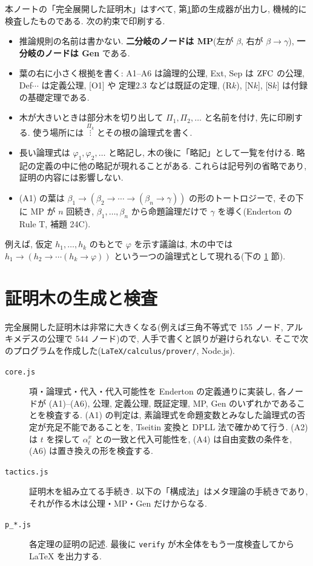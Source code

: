 本ノートの「完全展開した証明木」はすべて, 第\ref{sec:generator}節の生成器が出力し, 機械的に検査したものである. 次の約束で印刷する.
\begin{itemize}
  \item 推論規則の名前は書かない. \textbf{二分岐のノードは MP}(左が $\beta$, 右が $\beta \to \gamma$), \textbf{一分岐のノードは Gen} である.
  \item 葉の右に小さく根拠を書く: \textsf{A1}--\textsf{A6} は論理的公理, \textsf{Ext}, \textsf{Sep} は $\mathrm{ZFC}$ の公理, \textsf{Def$\cdots$} は定義公理, [O1] や 定理2.3 などは既証の定理, (R$k$), [N$k$], [S$k$] は付録の基礎定理である.
  \item 木が大きいときは部分木を切り出して $\Pi_1, \Pi_2, \ldots$ と名前を付け, 先に印刷する. 使う場所には $\overset{\Pi_k}{\vdots}$ とその根の論理式を書く.
  \item 長い論理式は $\varphi_1, \varphi_2, \ldots$ と略記し, 木の後に「略記」として一覧を付ける. 略記の定義の中に他の略記が現れることがある. これらは記号列の省略であり, 証明の内容には影響しない.
  \item (A1) の葉は $\beta_1 \to (\beta_2 \to \cdots \to (\beta_n \to \gamma))$ の形のトートロジーで, その下に MP が $n$ 回続き, $\beta_1, \ldots, \beta_n$ から命題論理だけで $\gamma$ を導く(Enderton の Rule T, 補題 24C).
\end{itemize}
例えば, 仮定 $h_1, \ldots, h_k$ のもとで $\varphi$ を示す議論は, 木の中では $h_1 \to (h_2 \to \cdots (h_k \to \varphi))$ という一つの論理式として現れる(下の \ref{sec:generator} 節).

\section{証明木の生成と検査}\label{sec:generator}

完全展開した証明木は非常に大きくなる(例えば三角不等式で 155 ノード, アルキメデスの公理で 544 ノード)ので, 人手で書くと誤りが避けられない. そこで次のプログラムを作成した(\texttt{LaTeX/calculus/prover/}, Node.js).

\begin{description}
  \item[\texttt{core.js}] 項・論理式・代入・代入可能性を Enderton の定義通りに実装し, 各ノードが (A1)--(A6), 公理, 定義公理, 既証定理, MP, Gen のいずれかであることを検査する. (A1) の判定は, 素論理式を命題変数とみなした論理式の否定が充足不能であることを, Tseitin 変換と DPLL 法で確かめて行う. (A2) は $t$ を探して $\alpha^x_t$ との一致と代入可能性を, (A4) は自由変数の条件を, (A6) は置き換えの形を検査する.
  \item[\texttt{tactics.js}] 証明木を組み立てる手続き. 以下の「構成法」はメタ理論の手続きであり, それが作る木は公理・MP・Gen だけからなる.
  \item[\texttt{p\_*.js}] 各定理の証明の記述. 最後に \texttt{verify} が木全体をもう一度検査してから \LaTeX{} を出力する.
\end{description}

